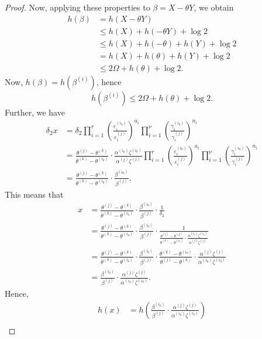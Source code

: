 \begin{proof}
Now, applying these properties to $\beta = X-\theta Y$, we obtain
\begin{align*}
h(\beta)	& = h(X-\theta Y)\\
		& \leq h(X) + h(-\theta Y) + \log{2}\\
		& \leq h(X) + h(-\theta) + h(Y) + \log{2}\\
		& = h(X) + h(\theta) + h(Y) + \log{2}\\
		& \leq 2\Omega + h(\theta) + \log{2}.
\end{align*}
Now, $h(\beta) = h(\beta^{(i)})$, hence
\[h(\beta^{(i)}) \leq 2\Omega + h(\theta) + \log{2}.\]
Further, we have
\begin{align*}
\delta_2x	& =  \delta_2 \prod_{i = 1}^{r}\left( \frac{\varepsilon_i^{(i_0)}}{\varepsilon_i^{(j)}}\right)^{a_i} \prod_{i = 1}^{\nu} \left( \frac{\gamma_i^{(i_0)}}{\gamma_i^{(j)}}\right)^{n_i} \\
		& =  \frac{\theta^{(j)} - \theta^{(k)}}{\theta^{(k)} - \theta^{(i_0)}}\cdot \frac{\alpha^{(i_0)}\zeta^{(i_0)}}{\alpha^{(j)}\zeta^{(j)}} \prod_{i = 1}^{r}\left( \frac{\varepsilon_i^{(i_0)}}{\varepsilon_i^{(j)}}\right)^{a_i} \prod_{i = 1}^{\nu} \left( \frac{\gamma_i^{(i_0)}}{\gamma_i^{(j)}}\right)^{n_i} \\
		& = \frac{\theta^{(j)} - \theta^{(k)}}{\theta^{(k)} - \theta^{(i_0)}}\cdot \frac{\beta^{(i_0)}}{\beta^{(j)}}.
\end{align*}
This means that 
\begin{align*}
x	& = \frac{\theta^{(j)} - \theta^{(k)}}{\theta^{(k)} - \theta^{(i_0)}}\cdot \frac{\beta^{(i_0)}}{\beta^{(j)}}\cdot\frac{1}{\delta_2}\\
	& =  \frac{\theta^{(j)} - \theta^{(k)}}{\theta^{(k)} - \theta^{(i_0)}}\cdot \frac{\beta^{(i_0)}}{\beta^{(j)}}\cdot\frac{1}{\frac{\theta^{(j)} - \theta^{(k)}}{\theta^{(k)} - \theta^{(i_0)}}\cdot \frac{\alpha^{(i_0)}\zeta^{(i_0)}}{\alpha^{(j)}\zeta^{(j)}}}\\
	& = \frac{\theta^{(j)} - \theta^{(k)}}{\theta^{(k)} - \theta^{(i_0)}}\cdot \frac{\beta^{(i_0)}}{\beta^{(j)}}\cdot\frac{\theta^{(k)} - \theta^{(i_0)}}{\theta^{(j)} - \theta^{(k)}}\cdot \frac{\alpha^{(j)}\zeta^{(j)}}{\alpha^{(i_0)}\zeta^{(i_0)}}\\
	& =\frac{\beta^{(i_0)}}{\beta^{(j)}}\cdot \frac{\alpha^{(j)}\zeta^{(j)}}{\alpha^{(i_0)}\zeta^{(i_0)}}.
\end{align*}
Hence, 
\begin{align*}
h(x)	& = h\left( \frac{\beta^{(i_0)}}{\beta^{(j)}}\cdot \frac{\alpha^{(j)}\zeta^{(j)}}{\alpha^{(i_0)}\zeta^{(i_0)}}\right)\\

\end{align*}
\end{proof}
